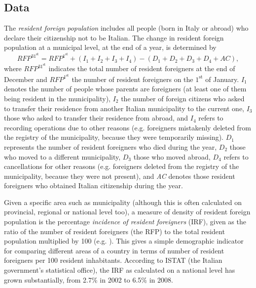 \subsection{Data}  

The \textit{resident foreign population} includes all people (born in Italy or abroad) who declare their citizenship not to be Italian. The change in resident foreign population at a municipal level, at the end of a year, is determined by
\begin{equation}
RFP^{31^\text{st}} = RFP^{1^\text{st}} + (I_1 + I_2 + I_3+ I_4) - (D_1 + D_2 + D_3 + D_4 + AC),
\label{it-rfp}
\end{equation}
where $RFP^{31^\text{st}}$ indicates the total number of resident foreigners at the end of December and $RFP^{1^\text{st}}$ the number of resident foreigners on the $1^\text{st}$ of January. $I_{1}$ denotes the number of people whose parents are foreigners (at least one of them being resident in the municipality), $I_{2}$ the number of foreign citizens who asked to transfer their residence from another Italian municipality to the current one, $I_{3}$ those who asked to transfer their residence from abroad, and $I_{4}$ refers to recording operations due to other reasons (e.g. foreigners mistakenly deleted from the registry of the municipality, because they were temporarily missing). $D_{1}$ represents the number of resident foreigners who died during the year, $D_{2}$ those who moved to a different municipality, $D_{3}$ those who moved abroad, $D_{4}$ refers to cancellations for other reasons (e.g. foreigners deleted from the registry of the municipality, because they were not present), and \textit{AC} denotes those resident foreigners who obtained Italian citizenship during the year. 

Given a specific area such as municipality (although this is often calculated on provincial, regional or national level too), a measure of density of resident foreign population is the percentage \textit{incidence of resident foreigners} (IRF), given as the ratio of the number of resident foreigners (the RFP) to the total resident population multiplied by 100 (e.g. \cite{Lowell2007}). This gives a simple demographic indicator for comparing different areas of a country in terms of number of resident foreigners per 100 resident inhabitants. According to ISTAT (the Italian government's statistical office), the IRF as calculated on a national level has grown substantially, from 2.7\% in 2002 to 6.5\% in 2008. 

